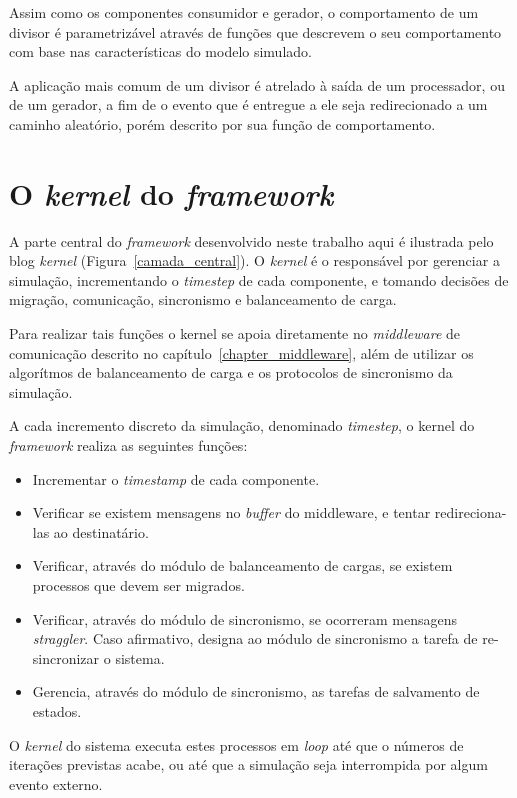 Assim como os componentes consumidor e gerador, o comportamento de um divisor é parametrizável através de funções que descrevem o seu comportamento com base nas características do modelo simulado.

A aplicação mais comum de um divisor é atrelado à saída de um processador, ou de um gerador, a fim de o evento que é entregue a ele seja redirecionado a um caminho aleatório, porém descrito por sua função de comportamento.

\section{O \textit{kernel} do \textit{framework}}

A parte central do \textit{framework} desenvolvido neste trabalho aqui é ilustrada pelo blog \textit{kernel} (Figura~\ref{camada_central}). O \textit{kernel} é o responsável por gerenciar a simulação, incrementando o \textit{timestep} de cada componente, e tomando decisões de migração, comunicação, sincronismo e balanceamento de carga.

Para realizar tais funções o kernel se apoia diretamente no \textit{middleware} de comunicação descrito no capítulo~\ref{chapter_middleware}, além de utilizar os algorítmos de balanceamento de carga e os protocolos de sincronismo da simulação.

A cada incremento discreto da simulação, denominado \textit{timestep}, o kernel do \textit{framework} realiza as seguintes funções:

\begin{itemize}
\item Incrementar o \textit{timestamp} de cada componente.
\item Verificar se existem mensagens no \textit{buffer} do middleware, e tentar redireciona-las ao destinatário.
\item Verificar, através do módulo de balanceamento de cargas, se existem processos que devem ser migrados.
\item Verificar, através do módulo de sincronismo, se ocorreram mensagens \textit{straggler}. Caso afirmativo, designa ao módulo de sincronismo a tarefa de re-sincronizar o sistema.
\item Gerencia, através do módulo de sincronismo, as tarefas de salvamento de estados.
\end{itemize}

O \textit{kernel} do sistema executa estes processos em \textit{loop} até que o números de iterações previstas acabe, ou até que a simulação seja interrompida por algum evento externo.

